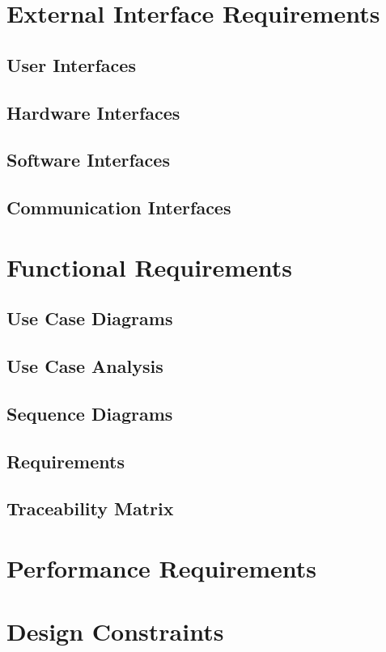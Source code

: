 \documentclass[a4paper,11pt]{report}
\begin{document}
\section{External Interface Requirements}
\subsection{User Interfaces}
\subsection{Hardware Interfaces}
\subsection{Software Interfaces}
\subsection{Communication Interfaces}

\section{Functional Requirements}
\subsection{Use Case Diagrams}
\subsection{Use Case Analysis}
\subsection{Sequence Diagrams}
\subsection{Requirements}
\subsection{Traceability Matrix}

\section{Performance Requirements}

\section{Design Constraints}
\end{document}
